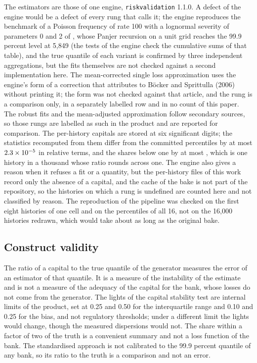 The estimators are those of one engine, \texttt{riskvalidation} 1.1.0. A defect of the engine would be a defect of every rung that calls it; the engine reproduces the benchmark of a Poisson frequency of rate 100 with a lognormal severity of parameters 0 and 2 of \citet[Example 9.4 and Tables 2 and 3]{shevchenko2010}, whose Panjer recursion on a unit grid reaches the 99.9 percent level at 5{,}849 (the tests of the engine check the cumulative sums of that table), and the true quantile of each variant is confirmed by three independent aggregations, but the fits themselves are not checked against a second implementation here.
The mean-corrected single loss approximation uses the engine's form of a correction that \citet{shevchenko2010} attributes to B\"ocker and Sprittulla (2006) without printing it; the form was not checked against that article, and the rung is a comparison only, in a separately labelled row and in no count of this paper. The robust fits and the mean-adjusted approximation follow secondary sources, so those rungs are labelled as such in the product and are reported for comparison. The per-history capitals are stored at six significant digits; the statistics recomputed from them differ from the committed percentiles by at most $2.3\times 10^{-5}$ in relative terms, and the shares below one by at most \chkShare{}, which is one history in a thousand whose ratio rounds across one.
The engine also gives a reason when it refuses a fit or a quantity, but the per-history files of this work record only the absence of a capital, and the cache of the bake is not part of the repository, so the histories on which a rung is undefined are counted here and not classified by reason. The reproduction of the pipeline was checked on the first eight histories of one cell and on the percentiles of all 16, not on the 16{,}000 histories redrawn, which would take about as long as the original bake.

\subsection{Construct validity}
\label{sec:lim-construct}

The ratio of a capital to the true quantile of the generator measures the error of an estimator of that quantile. It is a measure of the instability of the estimate and is not a measure of the adequacy of the capital for the bank, whose losses do not come from the generator. The lights of the capital stability test are internal limits of the product, set at 0.25 and 0.50 for the interquartile range and 0.10 and 0.25 for the bias, and not regulatory thresholds; under a different limit the lights would change, though the measured dispersions would not.
The share within a factor of two of the truth is a convenient summary and not a loss function of the bank. The standardised approach is not calibrated to the 99.9 percent quantile of any bank, so its ratio to the truth is a comparison and not an error.

